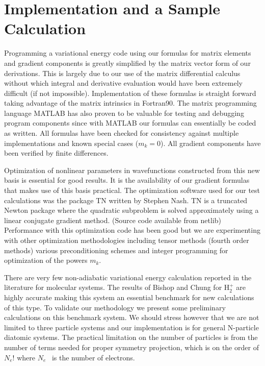 \documentclass[12pt,doublespace]{article}
\begin{document}
\section{Implementation and a Sample Calculation}

Programming a variational energy code using our formulas for matrix elements
and gradient components is greatly simplified by the matrix vector form of
our derivations. This is largely due to our use of the matrix differential
calculus without which integral and derivative evaluation would have been
extremely difficult (if not impossible). Implementation of these formulas is
straight forward taking advantage of the matrix intrinsics in Fortran90. The
matrix programming language MATLAB\cite{MATLAB} has also proven to be
valuable for testing and debugging program components since with MATLAB our
formulas can essentially be coded as written. All formulas have been checked
for consistency against multiple implementations and known special cases ($%
m_{k}=0$). All gradient components have been  verified by finite differences.

Optimization of nonlinear parameters in wavefunctions constructed from this
new basis is essential for good results. It is the availability of our
gradient formulas that makes use of this basis practical. The optimization
software used for our test calculations was the package TN written by
Stephen Nash\cite{NashTN}. TN is a truncated Newton package where the
quadratic subproblem is solved approximately using a linear conjugate
gradient method. (Source code available from netlib\cite{netlib}) 
Performance with this optimization code has been good but we are
experimenting with other optimization methodologies including tensor methods
(fourth order methods) various preconditioning schemes and integer
programming for optimization of the powers $m_{k}$. 

There are very few non-adiabatic variational energy calculation reported in
the literature for molecular systems. The results of Bishop and Chung\cite
{Bishop77} for H$_{2}^{+}$ are highly accurate making this system an
essential benchmark for new calculations of this type. To validate our
methodology we present some preliminary calculations on this benchmark
system. We should stress however that we are not limited to three particle
systems and our implementation is for general N-particle diatomic systems.
The practical limitation on the number of particles is from the number of
terms needed for proper symmetry projection, which is on the order of $N_{e}!
$ where $N_{e}$ \ is the number of electrons.
\end{document}
